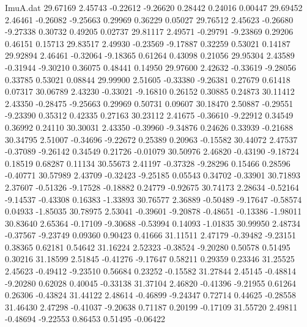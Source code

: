 \begin{filecontents}{ImuA.dat}
  29.67169    2.45743   -0.22612   -9.26620    0.28442    0.24016    0.00447
  29.69452    2.46461   -0.26082   -9.25663    0.29969    0.36229    0.05027
  29.76512    2.45623   -0.26680   -9.27338    0.30732    0.49205    0.02737
  29.81117    2.49571   -0.29791   -9.23869    0.29206    0.46151    0.15713
  29.83517    2.49930   -0.23569   -9.17887    0.32259    0.53021    0.14187
  29.92894    2.46461   -0.32064   -9.18365    0.61264    0.43098    0.21056
  29.95304    2.43589   -0.31944   -9.30210    0.36075    0.48441    0.14950
  29.97600    2.42632   -0.33619   -9.28056    0.33785    0.53021    0.08844
  29.99900    2.51605   -0.33380   -9.26381    0.27679    0.61418    0.07317
  30.06789    2.43230   -0.33021   -9.16810    0.26152    0.30885    0.24873
  30.11412    2.43350   -0.28475   -9.25663    0.29969    0.50731    0.09607
  30.18470    2.50887   -0.29551   -9.23390    0.35312    0.42335    0.27163
  30.23112    2.41675   -0.36610   -9.22912    0.34549    0.36992    0.24110
  30.30031    2.43350   -0.39960   -9.34876    0.24626    0.33939   -0.21688
  30.34795    2.51007   -0.34696   -9.22672    0.25389    0.20963   -0.15582
  30.44072    2.47537   -0.37089   -9.26142    0.34549    0.21726   -0.01079
  30.50976    2.46820   -0.43190   -9.18724    0.18519    0.68287    0.11134
  30.55673    2.41197   -0.37328   -9.28296    0.15466    0.28596   -0.40771
  30.57989    2.43709   -0.32423   -9.25185    0.05543    0.34702   -0.33901
  30.71893    2.37607   -0.51326   -9.17528   -0.18882    0.24779   -0.92675
  30.74173    2.28634   -0.52164   -9.14537   -0.43308    0.16383   -1.33893
  30.76577    2.36889   -0.50489   -9.17647   -0.58574    0.04933   -1.85035
  30.78975    2.53041   -0.39601   -9.20878   -0.48651   -0.13386   -1.98011
  30.83640    2.65364   -0.17109   -9.30688   -0.53994    0.14093   -1.01835
  30.99950    2.48734   -0.37567   -9.23749    0.09360    0.90423    0.41666
  31.11511    2.47179   -0.39482   -9.23151    0.38365    0.62181    0.54642
  31.16224    2.52323   -0.38524   -9.20280    0.50578    0.51495    0.30216
  31.18599    2.51845   -0.41276   -9.17647    0.58211    0.29359    0.23346
  31.25525    2.45623   -0.49412   -9.23510    0.56684    0.23252   -0.15582
  31.27844    2.45145   -0.48814   -9.20280    0.62028    0.40045   -0.33138
  31.37104    2.46820   -0.41396   -9.21955    0.61264    0.26306   -0.43824
  31.44122    2.48614   -0.46899   -9.24347    0.72714    0.44625   -0.28558
  31.46430    2.47298   -0.41037   -9.20638    0.71187    0.20199   -0.17109
  31.55720    2.49811   -0.48694   -9.22553    0.86453    0.51495   -0.06422

\end{filecontents}
